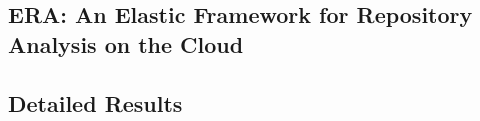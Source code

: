 \documentclass[msc]{ppgccufmg}
\begin{document}






\begin{appendices}

\chapter{ERA: An Elastic Framework for Repository Analysis on the Cloud}


\end{appendices}


\begin{attachments}


\chapter{Detailed Results}


\end{attachments}
\end{document}
